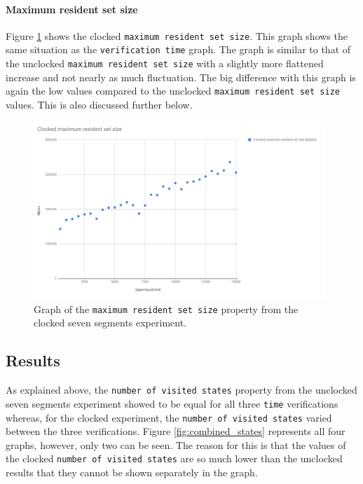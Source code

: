 \paragraph{Maximum resident set size}
Figure \ref{fig:clocked_resident_size} shows the clocked \texttt{maximum resident set size}. This graph shows the same situation as the \texttt{verification time} graph. The graph is similar to that of the unclocked \texttt{maximum resident set size} with a slightly more flattened increase and not nearly as much fluctuation. The big difference with this graph is again the low values compared to the unclocked \texttt{maximum resident set size} values. This is also discussed further below.
\begin{figure}
    \includegraphics[width=0.98\textwidth]{./figures/temporary_figures/clocked_maximum_resident_set_size.jpg}
\caption{Graph of the \texttt{maximum resident set size} property from the clocked seven segments experiment.}
\label{fig:clocked_resident_size}
\end{figure}
\subsection{Results}
As explained above, the \texttt{number of visited states} property from the unclocked seven segments experiment showed to be equal for all three \texttt{time} verifications whereas, for the clocked experiment, the \texttt{number of visited states} varied between the three verifications. Figure \ref{fig:combined_states} represents all four graphs, however, only two can be seen. %
The reason for this is that the values of the clocked \texttt{number of visited states} are so much lower than the unclocked results that they cannot be shown separately in the graph. \\

